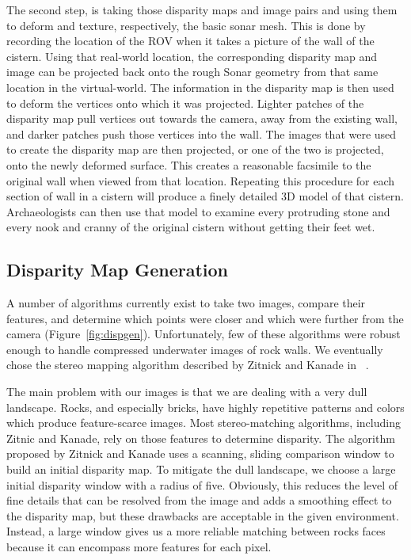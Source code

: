 \documentclass[a4paper,twoside]{article}
\begin{document}
The second step, is taking those disparity maps and image pairs and using them to deform and texture, respectively, the basic sonar mesh. 
This is done by recording the location of the ROV when it takes a picture of the wall of the cistern.  
Using that real-world location, the corresponding disparity map and image can be projected back onto the rough Sonar geometry from that same location in the virtual-world.
The information in the disparity map is then used to deform the vertices onto which it was projected.
Lighter patches of the disparity map pull vertices out towards the camera, away from the existing wall, and darker patches push those vertices into the wall.
The images that were used to create the disparity map are then projected, or one of the two is projected, onto the newly deformed surface.  
This creates a reasonable facsimile to the original wall when viewed from that location.  
Repeating this procedure for each section of wall in a cistern will produce a finely detailed 3D model of that cistern.  
Archaeologists can then use that model to examine every protruding stone and every nook and cranny of the original cistern without getting their feet wet.


\subsection{Disparity Map Generation}

\begin{figure*}[!ht]
   \vspace{-0.2cm}
   \caption{How we generate disparity maps from images.}
  \label{fig:dispgen}
 \end{figure*}


A number of algorithms currently exist to take two images, compare their features, and determine which points were closer and which were further from the camera (Figure~\ref{fig:dispgen}). 
Unfortunately, few of these algorithms were robust enough to handle compressed underwater images of rock walls.
We eventually chose the stereo mapping algorithm described by Zitnick and Kanade in ~\cite{stereo:zitKan}.

The main problem with our images is that we are dealing with a very dull landscape.  
Rocks, and especially bricks, have highly repetitive patterns and colors which produce feature-scarce images.
Most stereo-matching algorithms, including Zitnic and Kanade, rely on those features to determine disparity.  
The algorithm proposed by Zitnick and Kanade uses a scanning, sliding comparison window to build an initial disparity map.  
To mitigate the dull landscape, we choose a large initial disparity window with a radius of five. 
Obviously, this reduces the level of fine details that can be resolved from the image and adds a smoothing effect to the disparity map, but these drawbacks are acceptable in the given environment.  
Instead, a large window gives us a more reliable matching between rocks faces because it can encompass more features for each pixel.  
\end{document}
